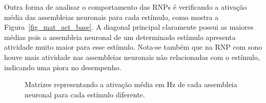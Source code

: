 Outra forma de analisar o comportamento das RNPs é verificando a ativação média das assembleias neuronais para cada estímulo, como
mostra a Figura~\ref{fig_mat_act_base}. A diagonal principal claramente possui as maiores médias pois a assembleia neuronal de um
determinado estímulo apresenta atividade muito maior para esse estímulo. Nota-se também que na RNP com sono houve mais atividade
nas assembleias neuronais não relacionadas com o estímulo, indicando uma piora no desempenho.

\begin{figure}[!ht]
\caption{Matrizes representando a ativação média em Hz de cada assembleia neuronal para cada estímulo diferente.}
\end{figure}

